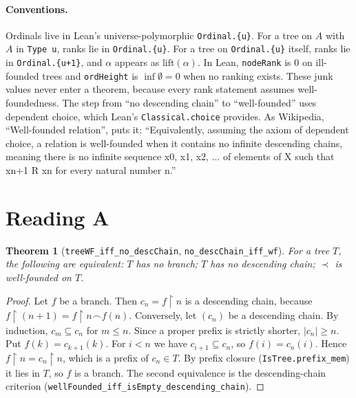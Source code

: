 \documentclass[11pt]{article}
\newtheorem{theorem}{Theorem}
\theoremstyle{definition}
\newcommand{\Ext}{\mathrel{\prec}}
\begin{document}
\paragraph{Conventions.} Ordinals live in Lean's universe-polymorphic \texttt{Ordinal.\{u\}}. For a
tree on $A$ with $A$ in \texttt{Type u}, ranks lie in \texttt{Ordinal.\{u\}}. For a tree on
\texttt{Ordinal.\{u\}} itself, ranks lie in \texttt{Ordinal.\{u+1\}}, and $\alpha$ appears as
$\mathrm{lift}(\alpha)$. In Lean, \texttt{nodeRank} is $0$ on ill-founded trees and \texttt{ordHeight}
is $\inf\emptyset=0$ when no ranking exists. These junk values never enter a theorem, because every
rank statement assumes well-foundedness. The step from ``no descending chain'' to ``well-founded'' uses
dependent choice, which Lean's \texttt{Classical.choice} provides. As Wikipedia, ``Well-founded
relation'', puts it: ``Equivalently, assuming the axiom of dependent choice, a relation is
well-founded when it contains no infinite descending chains, meaning there is no infinite sequence
x0, x1, x2, ... of elements of X such that xn+1 R xn for every natural number n.''

\section{Reading A}
\begin{theorem}[\texttt{treeWF\_iff\_no\_descChain}, \texttt{no\_descChain\_iff\_wf}]
For a tree $T$, the following are equivalent: $T$ has no branch; $T$ has no descending chain;
$\Ext$ is well-founded on $T$.
\end{theorem}
\begin{proof}
Let $f$ be a branch. Then $c_n=f{\restriction}n$ is a descending chain, because
$f{\restriction}(n+1)=f{\restriction}n\frown f(n)$. Conversely, let $(c_n)$ be a descending chain. By
induction, $c_m\subseteq c_n$ for $m\le n$. Since a proper prefix is strictly shorter,
$|c_n|\ge n$. Put $f(k)=c_{k+1}(k)$. For $i<n$ we have $c_{i+1}\subseteq c_n$, so
$f(i)=c_n(i)$. Hence $f{\restriction}n=c_n{\restriction}n$, which is a prefix of $c_n\in T$. By
prefix closure (\texttt{IsTree.prefix\_mem}) it lies in $T$, so $f$ is a branch. The second
equivalence is the descending-chain criterion
(\texttt{wellFounded\_iff\_isEmpty\_descending\_chain}).
\end{proof}
\end{document}
